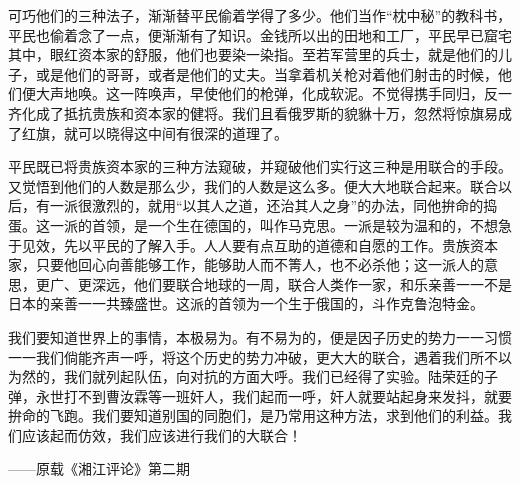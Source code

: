 可巧他们的三种法子，渐渐替平民偷着学得了多少。他们当作“枕中秘”的教科书，平民也偷着念了一点，便渐渐有了知识。金钱所以出的田地和工厂，平民早已窟宅其中，眼红资本家的舒服，他们也要染一染指。至若军营里的兵士，就是他们的儿子，或是他们的哥哥，或者是他们的丈夫。当拿着机关枪对着他们射击的时候，他们便大声地唤。这一阵唤声，早使他们的枪弹，化成软泥。不觉得携手同归，反一齐化成了抵抗贵族和资本家的健将。我们且看俄罗斯的貌貅十万，忽然将惊旗易成了红旗，就可以晓得这中间有很深的道理了。

平民既已将贵族资本家的三种方法窥破，并窥破他们实行这三种是用联合的手段。又觉悟到他们的人数是那么少，我们的人数是这么多。便大大地联合起来。联合以后，有一派很激烈的，就用“以其人之道，还治其人之身”的办法，同他拚命的捣蛋。这一派的首领，是一个生在德国的，叫作马克思。一派是较为温和的，不想急于见效，先以平民的了解入手。人人要有点互助的道德和自愿的工作。贵族资本家，只要他回心向善能够工作，能够助人而不箐人，也不必杀他；这一派人的意思，更广、更深远，他们要联合地球的一周，联合人类作一家，和乐亲善一一不是日本的亲善一一共臻盛世。这派的首领为一个生于俄国的，斗作克鲁泡特金。

我们要知道世界上的事情，本极易为。有不易为的，便是因子历史的势力一一习惯一一我们倘能齐声一呼，将这个历史的势力冲破，更大大的联合，遇着我们所不以为然的，我们就列起队伍，向对抗的方面大呼。我们已经得了实验。陆荣廷的子弹，永世打不到曹汝霖等一班奸人，我们起而一呼，奸人就要站起身来发抖，就要拚命的飞跑。我们要知道别国的同胞们，是乃常用这种方法，求到他们的利益。我们应该起而仿效，我们应该进行我们的大联合！

\begin{flushright}——原载《湘江评论》第二期\end{flushright}

